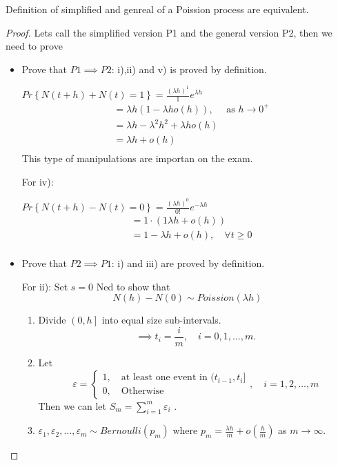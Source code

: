 \documentclass{article}
\theoremstyle{remark}
\newcommand{\newpara}
  {
  \vskip 0.4cm
  }
\begin{document}
\begin{theorem}
  Definition of simplified and genreal of a Poission process are equivalent.
\end{theorem}

\begin{proof}
  Lets call the simplified version P1 and the general version P2, then we need to prove
  \begin{itemize}
    \item Prove that $P1 \implies  P2$: i),ii) and v) is proved by definition.

      \newpara

    $\displaystyle Pr \left \{  N\left( t + h \right) + N\left( t \right) = 1 \right \}  = \frac{\left( \lambda h \right)^{1}}{1}  e^{\lambda h}$ \[
        \begin{split}
     & = \lambda h \left( 1- \lambda  h o\left( h \right) \right) , \quad  \text{ as } h\to 0^{+}  \\
     &=  \lambda  h - \lambda ^{2} h^2 + \lambda h o\left( h \right) \\
     &=  \lambda h + o\left( h \right) \\
        \end{split}
    \]
    This type of manipulations are importan on the exam.

      For iv):
    \newpara
  $\displaystyle Pr \left \{ N\left( t+ h \right) - N\left( t \right) = 0 \right \} = \frac{\left( \lambda h \right)^{0}}{0!}  e^{-\lambda h}$ \[
  \begin{split}
    &=  1\cdot \left( 1  \lambda  h + o\left( h \right) \right) \\
    &= 1 - \lambda h + o\left( h \right), \quad \forall t\ge0  \\
  \end{split}
  \]
\item Prove that $P2 \implies  P1$: i) and iii) are proved by definition.

  \newpara
  For ii): Set $s = 0$ Ned to show that \[
  N\left( h \right) - N\left( 0 \right) \sim Poission\left( \lambda h \right)
  \]
  \begin{enumerate}[label=(\roman*)]
    \item Divide $\left( 0, h \right ]$ into equal size sub-intervals.\[
    \implies  t_{i} = \frac{i}{m} , \quad  i=0,1, \ldots, m.
    \]
  \item Let \[
  \varepsilon = \begin{cases}
    1, \quad  \text{at least one event  in } (t_{i-1}, t_{i}] \\
    0, \quad \text{Otherwise}
  \end{cases}
  , \quad  i = 1, 2, \ldots, m
  \]
  Then we can let $\displaystyle S_{m} = \sum_{i=1}^{m} \varepsilon _{i} $ .
\item $\displaystyle  \varepsilon _{1} , \varepsilon _{2}, \ldots , \varepsilon _{m} \sim Bernoulli\left( p_{m} \right) $ where $p_{m} = \frac{\lambda h}{m}  + o\left( \frac{h}{m} \right) $  as $ m\to  \infty$.


\end{enumerate}
\end{itemize}
\end{proof}
\end{document}
